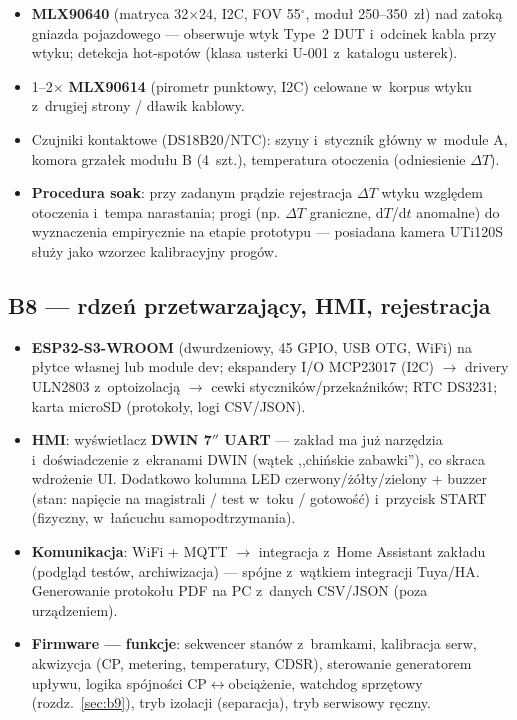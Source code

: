 \documentclass[11pt,a4paper]{article}
\begin{document}
\begin{itemize}
\item \textbf{MLX90640} (matryca 32$\times$24, I2C, FOV 55$^\circ$, moduł 250--350~zł) nad zatoką gniazda pojazdowego --- obserwuje wtyk Type~2 DUT i~odcinek kabla przy wtyku; detekcja hot-spotów (klasa usterki U-001 z~katalogu usterek).
\item 1--2$\times$ \textbf{MLX90614} (pirometr punktowy, I2C) celowane w~korpus wtyku z~drugiej strony / dławik kablowy.
\item Czujniki kontaktowe (DS18B20/NTC): szyny i~stycznik główny w~module A, komora grzałek modułu B (4~szt.), temperatura otoczenia (odniesienie $\Delta T$).
\item \textbf{Procedura soak}: przy zadanym prądzie rejestracja $\Delta T$ wtyku względem otoczenia i~tempa narastania; progi (np. $\Delta T$ graniczne, d$T$/d$t$ anomalne) do wyznaczenia empirycznie na etapie prototypu --- posiadana kamera UTi120S służy jako wzorzec kalibracyjny progów.
\end{itemize}

\subsection{B8 --- rdzeń przetwarzający, HMI, rejestracja}
\label{sec:b8}

\begin{itemize}
\item \textbf{ESP32-S3-WROOM} (dwurdzeniowy, 45 GPIO, USB OTG, WiFi) na płytce własnej lub module dev; ekspandery I/O MCP23017 (I2C) $\rightarrow$ drivery ULN2803 z~optoizolacją $\rightarrow$ cewki styczników/przekaźników; RTC DS3231; karta microSD (protokoły, logi CSV/JSON).
\item \textbf{HMI}: wyświetlacz \textbf{DWIN 7$''$ UART} --- zakład ma już narzędzia i~doświadczenie z~ekranami DWIN (wątek ,,chińskie zabawki''), co skraca wdrożenie UI. Dodatkowo kolumna LED czerwony/żółty/zielony + buzzer (stan: napięcie na magistrali / test w~toku / gotowość) i~przycisk START (fizyczny, w~łańcuchu samopodtrzymania).
\item \textbf{Komunikacja}: WiFi + MQTT $\rightarrow$ integracja z~Home Assistant zakładu (podgląd testów, archiwizacja) --- spójne z~wątkiem integracji Tuya/HA. Generowanie protokołu PDF na PC z~danych CSV/JSON (poza urządzeniem).
\item \textbf{Firmware --- funkcje}: sekwencer stanów z~bramkami, kalibracja serw, akwizycja (CP, metering, temperatury, CDSR), sterowanie generatorem upływu, logika spójności CP$\leftrightarrow$obciążenie, watchdog sprzętowy (rozdz.~\ref{sec:b9}), tryb izolacji (separacja), tryb serwisowy ręczny.
\end{itemize}
\end{document}
